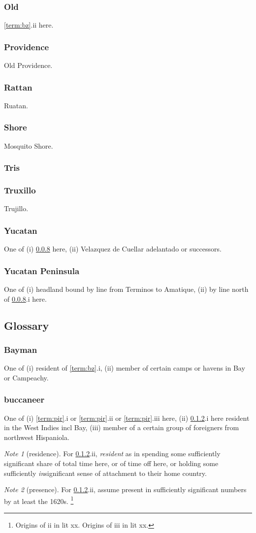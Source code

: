 \documentclass{amsart}
\theoremstyle{definition}%
\theoremstyle{definition}%
\theoremstyle{remark}%
\newtheorem*{note}{Note}
\begin{document}
\subsubsection{Old} \ref{term:bz}.ii here.
%
\subsubsection{Providence} Old Providence.
%
\subsubsection{Rattan} Ruatan.
%
\subsubsection{Shore} Mosquito Shore.
%
\subsubsection{Tris}
%
\subsubsection{Truxillo} Trujillo.
%
\subsubsection{Yucatan} One of (i) \ref{term:yucpen} here, (ii) Velazquez de Cuellar adelantado or successors.
%
\subsubsection{Yucatan Peninsula}\label{term:yucpen} One of (i) headland bound by line from Terminos to Amatique, (ii) by line north of \ref{term:yucpen}.i here.
%
\subsection{Glossary}
%
\subsubsection{Bayman} One of (i) resident of \ref{term:bz}.i, (ii) member of certain camps or havens in Bay or Campeachy.
%
\subsubsection{buccaneer}\label{term:bucc} One of (i) \ref{term:pir}.i or \ref{term:pir}.ii or \ref{term:pir}.iii here, (ii) \ref{term:bucc}.i here resident in the West Indies incl Bay, (iii) member of a certain group of foreigners from northwest Hispaniola.
%
	\begin{note}[residence]
	For \ref{term:bucc}.ii, \emph{resident} as in spending some sufficiently significant share of total time here, or of time off here, or holding some sufficiently \emph{in}significant sense of attachment to their home country.
	\end{note}
%
	\begin{note}[presence]
	For \ref{term:bucc}.ii, assume present in sufficiently significant numbers by at least the 1620s.%
	\footnote{Origins of ii in lit xx. Origins of iii in lit xx.}
	\end{note}
%
\end{document}
